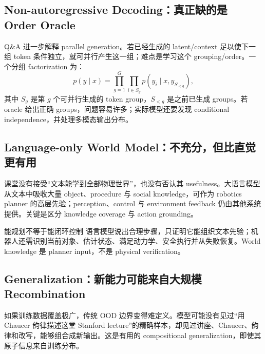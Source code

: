 \documentclass[a4paper]{article}
\begin{document}
\subsection{Non-autoregressive Decoding：真正缺的是 Order Oracle}

Q\&A 进一步解释 parallel generation。若已经生成的 latent/context 足以使下一组 token 条件独立，就可并行产生这一组；难点是学习这个 grouping/order。一个分组 factorization 为：
\[
p(y\mid x)=\prod_{g=1}^{G}\prod_{i\in S_g}p\!\left(y_i\mid x,y_{S_{<g}}\right),
\]
其中 $S_g$ 是第 $g$ 个可并行生成的 token group，$S_{<g}$ 是之前已生成 groups。若 oracle 给出正确 groups，问题容易许多；实际模型还要发现 conditional independence，并处理多模态输出分布。


\subsection{Language-only World Model：不充分，但比直觉更有用}

课堂没有接受“文本能学到全部物理世界”，也没有否认其 usefulness。大语言模型从文本中吸收大量 object、procedure 与 social knowledge，可作为 robotics planner 的高层先验；perception、control 与 environment feedback 仍由其他系统提供。关键是区分 knowledge coverage 与 action grounding。

\begin{warningbox}{能规划不等于能闭环控制}
语言模型说出合理步骤，只证明它能组织文本先验；机器人还需识别当前对象、估计状态、满足动力学、安全执行并从失败恢复。World knowledge 是 planner input，不是 physical verification。
\end{warningbox}


\subsection{Generalization：新能力可能来自大规模 Recombination}

如果训练数据覆盖极广，传统 OOD 边界变得难定义。模型可能没有见过“用 Chaucer 韵律描述这堂 Stanford lecture”的精确样本，却见过讲座、Chaucer、韵律和改写，能够组合成新输出。这是有用的 compositional generalization，即使其原子信息来自训练分布。
\end{document}
